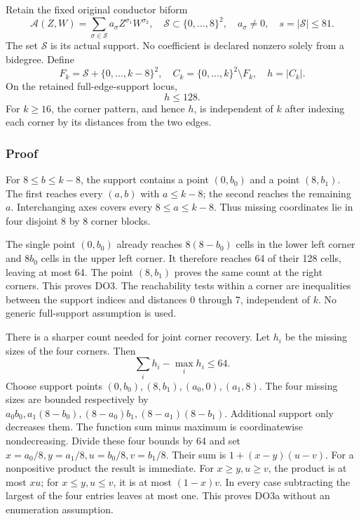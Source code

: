\documentclass[11pt]{article}
\begin{document}
Retain the fixed original conductor biform \[
\mathcal A(Z,W)=\sum_{\sigma\in\mathcal S}a_\sigma
Z^{\sigma_1}W^{\sigma_2},\quad
\mathcal S\subset\{0,\ldots,8\}^2,\quad a_\sigma\ne0,
\quad s=|\mathcal S|\le81.
\tag{DO1}
\] The set \(\mathcal S\) is its actual support. No coefficient is declared nonzero solely from a bidegree. Define \[
F_k=\mathcal S+\{0,\ldots,k-8\}^2,\quad
C_k=\{0,\ldots,k\}^2\setminus F_k,\quad h=|C_k|.
\tag{DO2}
\] On the retained full-edge-support locus, \[
\boxed{h\le128.}\tag{DO3}
\] For \(k\ge16\), the corner pattern, and hence \(h\), is independent of \(k\) after indexing each corner by its distances from the two edges.

\subsubsection{Proof}\label{proof}

For \(8\le b\le k-8\), the support contains a point \((0,b_0)\) and a point \((8,b_1)\). The first reaches every \((a,b)\) with \(a\le k-8\); the second reaches the remaining \(a\). Interchanging axes covers every \(8\le a\le k-8\). Thus missing coordinates lie in four disjoint 8 by 8 corner blocks.

The single point \((0,b_0)\) already reaches \(8(8-b_0)\) cells in the lower left corner and \(8b_0\) cells in the upper left corner. It therefore reaches 64 of their 128 cells, leaving at most 64. The point \((8,b_1)\) proves the same count at the right corners. This proves DO3. The reachability tests within a corner are inequalities between the support indices and distances 0 through 7, independent of \(k\). No generic full-support assumption is used.

There is a sharper count needed for joint corner recovery. Let \(h_i\) be the missing sizes of the four corners. Then \[
\boxed{\sum_i h_i-\max_i h_i\le64.}\tag{DO3a}
\] Choose support points \((0,b_0),(8,b_1),(a_0,0),(a_1,8)\). The four missing sizes are bounded respectively by \(a_0b_0,a_1(8-b_0),(8-a_0)b_1,(8-a_1)(8-b_1)\). Additional support only decreases them. The function sum minus maximum is coordinatewise nondecreasing. Divide these four bounds by 64 and set \(x=a_0/8,y=a_1/8,u=b_0/8,v=b_1/8\). Their sum is \(1+(x-y)(u-v)\). For a nonpositive product the result is immediate. For \(x\ge y,u\ge v\), the product is at most \(xu\); for \(x\le y,u\le v\), it is at most \((1-x)v\). In every case subtracting the largest of the four entries leaves at most one. This proves DO3a without an enumeration assumption.
\end{document}
